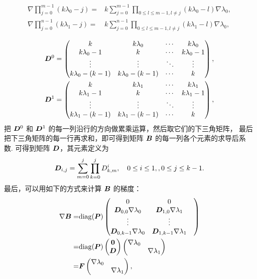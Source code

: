 \documentclass{article}
\begin{document}
\begin{align*}
    \nabla \prod_{j = 0}^{m - 1} (k\lambda_0 - j)
    = & k\sum_{j=0}^{m - 1}\prod_{0\le l \le m-1, l\not= j}(k\lambda_0 -
    l)\nabla \lambda_0,\\
    \nabla \prod_{j = 0}^{n - 1} (k\lambda_1 - j)
    = & k\sum_{j=0}^{n - 1}\prod_{0\le l \le m-1, l\not= j}(k\lambda_1 -
    l)\nabla \lambda_0,\\
\end{align*}
\begin{align*}
{\boldsymbol D}^0 = 
\begin{pmatrix}
k & k\lambda_0 & \cdots & k\lambda_0 \\
k\lambda_0 - 1 & k & \cdots & k\lambda_0 - 1 \\
\vdots & \vdots & \ddots & \vdots \\
k\lambda_0 - (k-1) & k\lambda_0 - (k-1) & \cdots & k 
\end{pmatrix},\\ 
{\boldsymbol D}^1 = 
\begin{pmatrix}
k & k\lambda_1 & \cdots & k\lambda_1 \\
k\lambda_1 - 1 & k & \cdots & k\lambda_1 - 1 \\
\vdots & \vdots & \ddots & \vdots \\
k\lambda_1 - (k-1) & k\lambda_1 - (k-1) & \cdots & k 
\end{pmatrix},\\ 
\end{align*}
把 ${\boldsymbol D}^0$ 和 ${\boldsymbol D}^1$ 的每一列沿行的方向做累乘运算，然后取它们的下三角矩阵，
最后把下三角矩阵的每一行再求和，即可得到矩阵 ${\boldsymbol B}$ 的每一列各个元素的求导后系
数. 可得到矩阵 ${\boldsymbol D}$，其元素定义为 
$$
{\boldsymbol D}_{i,j} = \sum_{m=0}^j\prod_{k=0}^j D^i_{k, m},\quad 0 \le i \le 1,
, 0 \le j \le k-1.
$$
最后，可以用如下的方式来计算 ${\boldsymbol B}$ 的梯度：
\begin{equation*}
\begin{aligned}
\nabla {\boldsymbol B} = & \mathrm{diag}({\boldsymbol P})
\begin{pmatrix}
0 & 0 \\
{\boldsymbol D}_{0,0} \nabla \lambda_0 & 
{\boldsymbol D}_{1,0} \nabla \lambda_1 \\
\vdots & \vdots\\
{\boldsymbol D}_{0, k-1} \nabla \lambda_0 &
{\boldsymbol D}_{1, k-1} \nabla \lambda_1 & 
\end{pmatrix}\\
= & \mathrm{diag}({\boldsymbol P})
\begin{pmatrix}
\mathbf 0\\
{\boldsymbol D}
\end{pmatrix}
\begin{pmatrix}
\nabla \lambda_0 \\
 & \nabla \lambda_1 \\
\end{pmatrix}\\
= & {\boldsymbol F} 
\begin{pmatrix}
\nabla \lambda_0 &  \\
 & \nabla \lambda_1 \\
\end{pmatrix},
\end{aligned}
\end{equation*}
\end{document}
